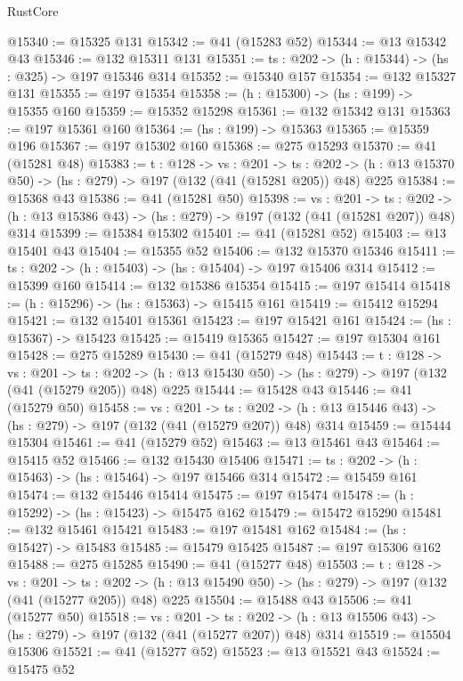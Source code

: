 \begin{lexlean}{RustCore}
\begin{coremodule}
@15340 := @15325 @131
@15342 := @41 (@15283 @52)
@15344 := @13 @15342 @43
@15346 := @132 @15311 @131
@15351 := {ts : @202} -> (h : @15344) -> (hs : @325) -> @197 @15346 @314
@15352 := @15340 @157
@15354 := @132 @15327 @131
@15355 := @197 @15354
@15358 := (h : @15300) -> (hs : @199) -> @15355 @160
@15359 := @15352 @15298
@15361 := @132 @15342 @131
@15363 := @197 @15361 @160
@15364 := (hs : @199) -> @15363
@15365 := @15359 @196
@15367 := @197 @15302 @160
@15368 := @275 @15293
@15370 := @41 (@15281 @48)
@15383 := {t : @128} ->
  {vs : @201} ->
  {ts : @202} -> (h : @13 @15370 @50) -> (hs : @279) -> @197 (@132 (@41 (@15281 @205)) @48) @225
@15384 := @15368 @43
@15386 := @41 (@15281 @50)
@15398 := {vs : @201} ->
  {ts : @202} -> (h : @13 @15386 @43) -> (hs : @279) -> @197 (@132 (@41 (@15281 @207)) @48) @314
@15399 := @15384 @15302
@15401 := @41 (@15281 @52)
@15403 := @13 @15401 @43
@15404 := @15355 @52
@15406 := @132 @15370 @15346
@15411 := {ts : @202} -> (h : @15403) -> (hs : @15404) -> @197 @15406 @314
@15412 := @15399 @160
@15414 := @132 @15386 @15354
@15415 := @197 @15414
@15418 := (h : @15296) -> (hs : @15363) -> @15415 @161
@15419 := @15412 @15294
@15421 := @132 @15401 @15361
@15423 := @197 @15421 @161
@15424 := (hs : @15367) -> @15423
@15425 := @15419 @15365
@15427 := @197 @15304 @161
@15428 := @275 @15289
@15430 := @41 (@15279 @48)
@15443 := {t : @128} ->
  {vs : @201} ->
  {ts : @202} -> (h : @13 @15430 @50) -> (hs : @279) -> @197 (@132 (@41 (@15279 @205)) @48) @225
@15444 := @15428 @43
@15446 := @41 (@15279 @50)
@15458 := {vs : @201} ->
  {ts : @202} -> (h : @13 @15446 @43) -> (hs : @279) -> @197 (@132 (@41 (@15279 @207)) @48) @314
@15459 := @15444 @15304
@15461 := @41 (@15279 @52)
@15463 := @13 @15461 @43
@15464 := @15415 @52
@15466 := @132 @15430 @15406
@15471 := {ts : @202} -> (h : @15463) -> (hs : @15464) -> @197 @15466 @314
@15472 := @15459 @161
@15474 := @132 @15446 @15414
@15475 := @197 @15474
@15478 := (h : @15292) -> (hs : @15423) -> @15475 @162
@15479 := @15472 @15290
@15481 := @132 @15461 @15421
@15483 := @197 @15481 @162
@15484 := (hs : @15427) -> @15483
@15485 := @15479 @15425
@15487 := @197 @15306 @162
@15488 := @275 @15285
@15490 := @41 (@15277 @48)
@15503 := {t : @128} ->
  {vs : @201} ->
  {ts : @202} -> (h : @13 @15490 @50) -> (hs : @279) -> @197 (@132 (@41 (@15277 @205)) @48) @225
@15504 := @15488 @43
@15506 := @41 (@15277 @50)
@15518 := {vs : @201} ->
  {ts : @202} -> (h : @13 @15506 @43) -> (hs : @279) -> @197 (@132 (@41 (@15277 @207)) @48) @314
@15519 := @15504 @15306
@15521 := @41 (@15277 @52)
@15523 := @13 @15521 @43
@15524 := @15475 @52

\end{coremodule}
\end{lexlean}

